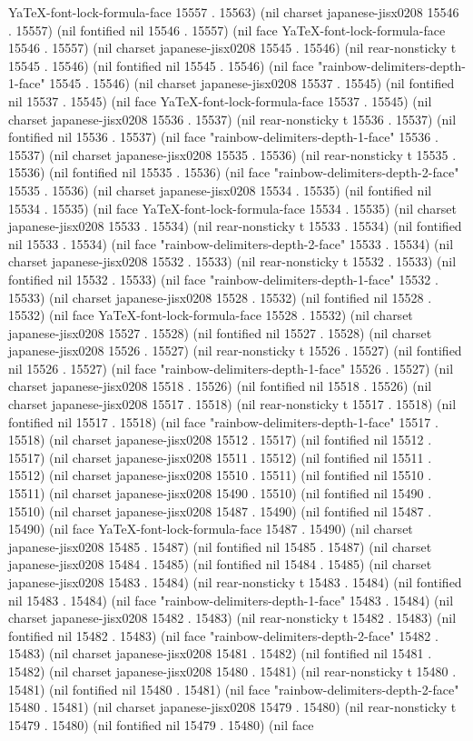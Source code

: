 YaTeX-font-lock-formula-face 15557 . 15563) (nil charset japanese-jisx0208 15546 . 15557) (nil fontified nil 15546 . 15557) (nil face YaTeX-font-lock-formula-face 15546 . 15557) (nil charset japanese-jisx0208 15545 . 15546) (nil rear-nonsticky t 15545 . 15546) (nil fontified nil 15545 . 15546) (nil face "rainbow-delimiters-depth-1-face" 15545 . 15546) (nil charset japanese-jisx0208 15537 . 15545) (nil fontified nil 15537 . 15545) (nil face YaTeX-font-lock-formula-face 15537 . 15545) (nil charset japanese-jisx0208 15536 . 15537) (nil rear-nonsticky t 15536 . 15537) (nil fontified nil 15536 . 15537) (nil face "rainbow-delimiters-depth-1-face" 15536 . 15537) (nil charset japanese-jisx0208 15535 . 15536) (nil rear-nonsticky t 15535 . 15536) (nil fontified nil 15535 . 15536) (nil face "rainbow-delimiters-depth-2-face" 15535 . 15536) (nil charset japanese-jisx0208 15534 . 15535) (nil fontified nil 15534 . 15535) (nil face YaTeX-font-lock-formula-face 15534 . 15535) (nil charset japanese-jisx0208 15533 . 15534) (nil rear-nonsticky t 15533 . 15534) (nil fontified nil 15533 . 15534) (nil face "rainbow-delimiters-depth-2-face" 15533 . 15534) (nil charset japanese-jisx0208 15532 . 15533) (nil rear-nonsticky t 15532 . 15533) (nil fontified nil 15532 . 15533) (nil face "rainbow-delimiters-depth-1-face" 15532 . 15533) (nil charset japanese-jisx0208 15528 . 15532) (nil fontified nil 15528 . 15532) (nil face YaTeX-font-lock-formula-face 15528 . 15532) (nil charset japanese-jisx0208 15527 . 15528) (nil fontified nil 15527 . 15528) (nil charset japanese-jisx0208 15526 . 15527) (nil rear-nonsticky t 15526 . 15527) (nil fontified nil 15526 . 15527) (nil face "rainbow-delimiters-depth-1-face" 15526 . 15527) (nil charset japanese-jisx0208 15518 . 15526) (nil fontified nil 15518 . 15526) (nil charset japanese-jisx0208 15517 . 15518) (nil rear-nonsticky t 15517 . 15518) (nil fontified nil 15517 . 15518) (nil face "rainbow-delimiters-depth-1-face" 15517 . 15518) (nil charset japanese-jisx0208 15512 . 15517) (nil fontified nil 15512 . 15517) (nil charset japanese-jisx0208 15511 . 15512) (nil fontified nil 15511 . 15512) (nil charset japanese-jisx0208 15510 . 15511) (nil fontified nil 15510 . 15511) (nil charset japanese-jisx0208 15490 . 15510) (nil fontified nil 15490 . 15510) (nil charset japanese-jisx0208 15487 . 15490) (nil fontified nil 15487 . 15490) (nil face YaTeX-font-lock-formula-face 15487 . 15490) (nil charset japanese-jisx0208 15485 . 15487) (nil fontified nil 15485 . 15487) (nil charset japanese-jisx0208 15484 . 15485) (nil fontified nil 15484 . 15485) (nil charset japanese-jisx0208 15483 . 15484) (nil rear-nonsticky t 15483 . 15484) (nil fontified nil 15483 . 15484) (nil face "rainbow-delimiters-depth-1-face" 15483 . 15484) (nil charset japanese-jisx0208 15482 . 15483) (nil rear-nonsticky t 15482 . 15483) (nil fontified nil 15482 . 15483) (nil face "rainbow-delimiters-depth-2-face" 15482 . 15483) (nil charset japanese-jisx0208 15481 . 15482) (nil fontified nil 15481 . 15482) (nil charset japanese-jisx0208 15480 . 15481) (nil rear-nonsticky t 15480 . 15481) (nil fontified nil 15480 . 15481) (nil face "rainbow-delimiters-depth-2-face" 15480 . 15481) (nil charset japanese-jisx0208 15479 . 15480) (nil rear-nonsticky t 15479 . 15480) (nil fontified nil 15479 . 15480) (nil face 